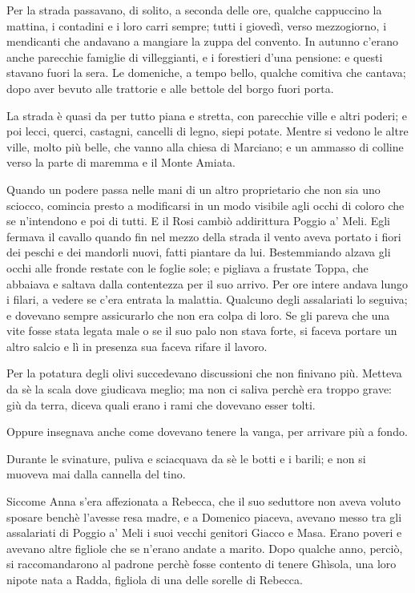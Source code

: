 Per la strada passavano, di solito, a seconda delle ore, qualche cappuccino la mattina, i contadini e i loro carri sempre; tutti i giovedì, verso mezzogiorno, i mendicanti che andavano a mangiare la zuppa del convento. In autunno c'erano anche parecchie famiglie di villeggianti, e i forestieri d'una pensione: e questi stavano fuori la sera. Le domeniche, a tempo bello, qualche comitiva che cantava; dopo aver bevuto alle trattorie e alle bettole del borgo fuori porta.

La strada è quasi da per tutto piana e stretta, con parecchie ville e altri poderi; e poi lecci, querci, castagni, cancelli di legno, siepi potate. Mentre si vedono le altre ville, molto più belle, che vanno alla chiesa di Marciano; e un ammasso di colline verso la parte di maremma e il Monte Amiata.

Quando un podere passa nelle mani di un altro proprietario che non sia uno sciocco, comincia presto a modificarsi in un modo visibile agli occhi di coloro che se n'intendono e poi di tutti. E il Rosi cambiò addirittura Poggio a' Meli. Egli fermava il cavallo quando fin nel mezzo della strada il vento aveva portato i fiori dei peschi e dei mandorli nuovi, fatti piantare da lui. Bestemmiando alzava gli occhi alle fronde restate con le foglie sole; e pigliava a frustate Toppa, che abbaiava e saltava dalla contentezza per il suo arrivo. Per ore intere andava lungo i filari, a vedere se c’era entrata la malattia. Qualcuno degli assalariati lo seguiva; e dovevano sempre assicurarlo che non era colpa di loro. Se gli pareva che una vite fosse stata legata male o se il suo palo non stava forte, si faceva portare un altro salcio e lì in presenza sua faceva rifare il lavoro.

Per la potatura degli olivi succedevano discussioni che non finivano più. Metteva da sè la scala dove giudicava meglio; ma non ci saliva perchè era troppo grave: giù da terra, diceva quali erano i rami che dovevano esser tolti.

Oppure insegnava anche come dovevano tenere la vanga, per arrivare più a fondo.

Durante le svinature, puliva e sciacquava da sè le botti e i barili; e non si muoveva mai dalla cannella del tino.

Siccome Anna s’era affezionata a Rebecca, che il suo seduttore non aveva voluto sposare benchè l’avesse resa madre, e a Domenico piaceva, avevano messo tra gli assalariati di Poggio a’ Meli i suoi vecchi genitori Giacco e Masa. Erano poveri e avevano altre figliole che se n’erano andate a marito. Dopo qualche anno, perciò, si raccomandarono al padrone perchè fosse contento di tenere Ghìsola, una loro nipote nata a Radda, figliola di una delle sorelle di Rebecca.

